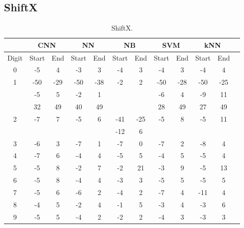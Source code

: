 \subsection{ShiftX}
\begin{table}[ht]
\centering
\begin{tabular}{|c|c|c|c|c|c|c|c|c|c|c|c|}
    \hline
     & \multicolumn{2}{c}{\textbf{CNN}} &  \multicolumn{2}{|c|}{\textbf{NN}} &\multicolumn{2}{c}{\textbf{NB}} & \multicolumn{2}{|c|}{\textbf{SVM}} & \multicolumn{2}{c|}{\textbf{kNN}} \\
    \hline
    Digit  &   Start & End & Start & End & Start & End & Start & End & Start & End \\
    \hline
    0  &   -5&4 & -3&3 & -4&3 & -4&3 & -4&4 \\
    \hline
        \multirow{3}{*}{1}
            &-50&-29 & -50&-38 &  \multirow{3}{*}{-2}&\multirow{3}{*}{2} & -50&-28 & -50&-25\\
            &-5&5 & -2&1 & & & -6&4 & -9&11\\
            &32&49 & 40&49  & & & 28&49 & 27&49\\
    \hline
    \multirow{2}{*}{2}  
        &   \multirow{2}{*}{-7}&\multirow{2}{*}{7}  &  \multirow{2}{*}{-5}&\multirow{2}{*}{6}  &  -41&-25   &  \multirow{2}{*}{-5}&\multirow{2}{*}{8} & \multirow{2}{*}{-5}&\multirow{2}{*}{11}\\
        & & &   & & -12&6   & & & &\\          
    \hline
    3  &   -6&3 & -7&1 & -7&0 & -7&2 & -8&4  \\
    \hline
    4  &   -7&6 & -4&4 & -5&5 & -4&5 & -5&4 \\
    \hline
    5  &   -5&8 & -2&7 & -2&21 & -3&9 & -5&13 \\
    \hline
    6  &   -5&8 & -4&4 & -3&3 & -5&5 & -5&5 \\
    \hline
    7  &   -5&6 & -6&2 & -4&2 & -7&4 & -11&4 \\
    \hline
    8  &   -4&5 & -2&4 & -1&5 & -3&4 & -3&6 \\
    \hline
    9  &   -5&5 & -4&2 & -2&2 & -4&3 & -3&3 \\ 
    \hline
\end{tabular}
\caption{ShiftX.}
\label{tbl:test-file-format}
\end{table}

\shiftX
    
